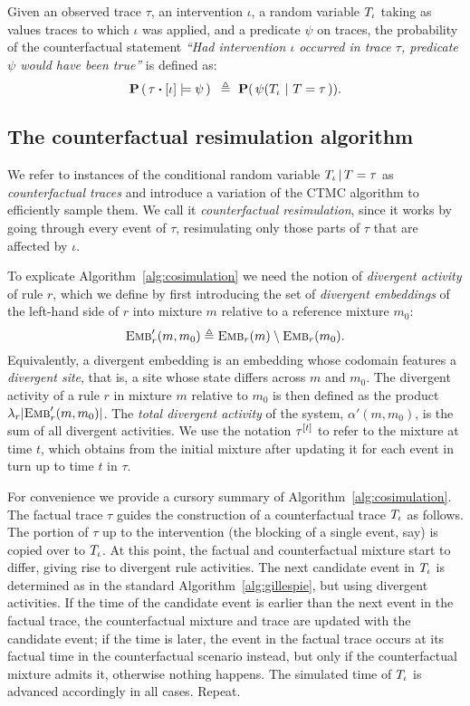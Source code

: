\begin{definition}\label{def:counterfactuals}
Given an observed trace $\tau$, an intervention $\iota$, a random variable ${T_\iota}{}$ taking as values traces to which $\iota$ was applied, and a predicate $\psi$ on traces, the probability of the counterfactual statement \textit{``Had intervention $\iota$ occurred in trace $\tau$, predicate $\psi$ would have been true''} is defined as:
  \[ \PCFST{} \ \eqdef \
    \mathbf{P}(\, \psi(\ATRAJ{} \ |\ T = \tau\,)). \]
\end{definition}

\subsection{The counterfactual resimulation algorithm}

We refer to instances of the conditional random variable ${T_\iota\,|\,T=\tau}{}$ as \emph{counterfactual traces} and introduce a variation of the CTMC algorithm to efficiently sample them.  We call it \emph{counterfactual resimulation}, since it works by going through every event of $\tau$, resimulating only those parts of $\tau$ that are affected by $\iota$.



To explicate Algorithm~\ref{alg:cosimulation} we need the notion of \emph{divergent activity} of rule $r$, which we define by first introducing the set of \emph{divergent embeddings} of the left-hand side of $r$ into mixture $m$ relative to a reference mixture $m_0$: \[{\textsc{Emb}}'_{r}(m, m_0) \triangleq {\textsc{Emb}}_{r}(m) \setminus {\textsc{Emb}}_{r}(m_0).\] Equivalently, a divergent embedding is an embedding whose codomain features a \emph{divergent site}, that is, a site whose state differs across $m$ and $m_0$. The {divergent activity} of a rule $r$ in mixture $m$ relative to $m_0$ is then defined as the product $\lambda_r|{\textsc{Emb}}'_{r}(m, m_0)|$. The \emph{total divergent activity} of the system, $\alpha'(m, m_0)$, is the sum of all divergent activities. We use the notation $\tau^{[t]}$ to refer to the mixture at time $t$, which obtains from the initial mixture after updating it for each event in turn up to time $t$ in $\tau$. 

For convenience we provide a cursory summary of Algorithm~\ref{alg:cosimulation}. The factual trace $\tau$ guides the construction of a counterfactual trace ${T_\iota}{}$ as follows. The portion of $\tau$ up to the intervention (the blocking of a single event, say) is copied over to ${T_\iota}{}$. At this point, the factual and counterfactual mixture start to differ, giving rise to divergent rule activities. The next candidate event in ${T_\iota}{}$ is determined as in the standard Algorithm~\ref{alg:gillespie}, but using divergent activities. If the time of the candidate event is earlier than the next event in the factual trace, the counterfactual mixture and trace are updated with the candidate event; if the time is later, the event in the factual trace occurs at its factual time in the counterfactual scenario instead, but only if the counterfactual mixture admits it, otherwise nothing happens. The simulated time of ${T_\iota}{}$ is advanced accordingly in all cases. Repeat.

